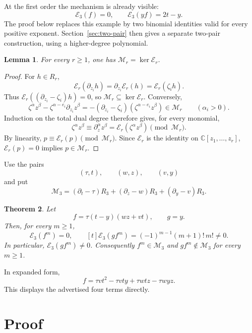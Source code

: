 \documentclass[11pt]{article}
\newtheorem{theorem}{Theorem}
\newtheorem{lemma}[theorem]{Lemma}
\newcommand{\C}{\mathbb C}
\newcommand{\Eop}{\mathcal E}
\newcommand{\M}{\mathcal M}
\begin{document}
At the first order the mechanism is already visible:
\[
 \Eop_3(f)=0,\qquad \Eop_3(yf)=2t-y.
\]
The proof below replaces this example by two binomial identities valid
for every positive exponent. Section~\ref{sec:two-pair} then gives a
separate two-pair construction, using a higher-degree polynomial.

\begin{lemma}\label{lem:kernel}
For every \(r\geq1\), one has \(\M_r=\ker\Eop_r\).
\end{lemma}

\begin{proof}
For \(h\in R_r\),
\[
 \Eop_r(\partial_{z_i}h)
 =\partial_{z_i}\Eop_r(h)
 =\Eop_r(\zeta_i h).
\]
Thus \(\Eop_r((\partial_{z_i}-\zeta_i)h)=0\), so
\(\M_r\subseteq\ker\Eop_r\).  Conversely,
\[
 \zeta^\alpha z^\beta
 -\zeta^{\alpha-e_i}\partial_{z_i}z^\beta
 =-(\partial_{z_i}-\zeta_i)(\zeta^{\alpha-e_i}z^\beta)
 \in\M_r\qquad(\alpha_i>0).
\]
Induction on the total dual degree therefore gives, for every monomial,
\[
 \zeta^\alpha z^\beta
 \equiv\partial_z^\alpha z^\beta
 =\Eop_r(\zeta^\alpha z^\beta)
 \pmod{\M_r}.
\]
By linearity, \(p\equiv\Eop_r(p)\pmod{\M_r}\).  Since \(\Eop_r\) is
the identity on \(\C[z_1,\ldots,z_r]\), \(\Eop_r(p)=0\) implies
\(p\in\M_r\).
\end{proof}

Use the pairs
\[
 (\tau,t),\qquad(w,z),\qquad(v,y)
\]
and put
\[
 \M_3=(\partial_t-\tau)R_3+
       (\partial_z-w)R_3+
       (\partial_y-v)R_3.
\]

\begin{theorem}\label{thm:main}
Let
\[
 \boxed{\quad
 f=\tau(t-y)(wz+vt),\qquad g=y.
 \quad}
\]
Then, for every \(m\geq1\),
\[
 \Eop_3(f^m)=0,\qquad
 [t]\Eop_3(gf^m)=(-1)^{m-1}(m+1)!\,m!\neq0.
\]
In particular, \(\Eop_3(gf^m)\neq0\).  Consequently
\(f^m\in\M_3\) and \(gf^m\notin\M_3\) for every \(m\geq1\).
\end{theorem}

In expanded form,
\[
\boxed{\;
 f=\tau vt^2-\tau vty+\tau wtz-\tau wyz.
\;}
\]
This displays the advertised four terms directly.

\section{Proof}
\end{document}
